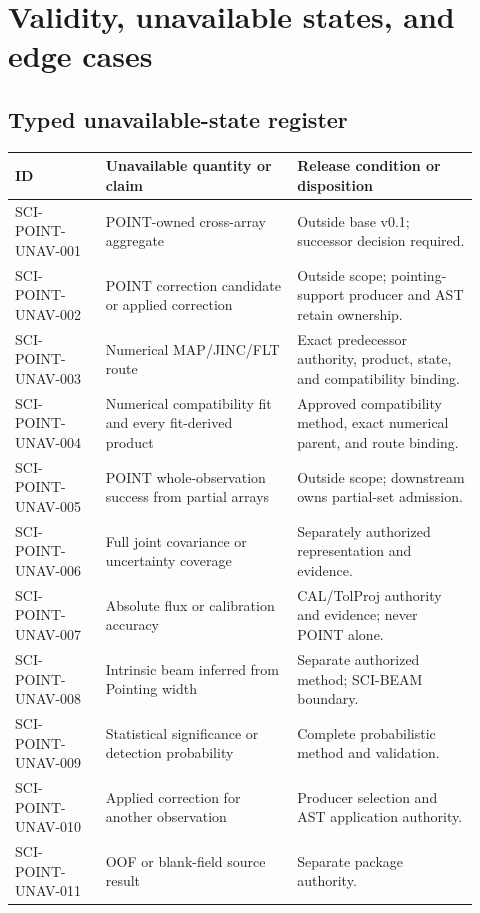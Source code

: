 \section{Validity, unavailable states, and edge cases}\label{sec:validity}

\subsection{Typed unavailable-state register}\label{sec:unavailable-register}

\small
\begin{longtable}{@{}p{0.18\linewidth}p{0.38\linewidth}p{0.36\linewidth}@{}}
\toprule
ID & Unavailable quantity or claim & Release condition or disposition \\
\midrule
\endhead
SCI-POINT-UNAV-001 & POINT-owned cross-array aggregate & Outside base v0.1; successor decision required. \\
SCI-POINT-UNAV-002 & POINT correction candidate or applied correction & Outside scope; pointing-support producer and AST retain ownership. \\
SCI-POINT-UNAV-003 & Numerical MAP/JINC/FLT route & Exact predecessor authority, product, state, and compatibility binding. \\
SCI-POINT-UNAV-004 & Numerical compatibility fit and every fit-derived product & Approved compatibility method, exact numerical parent, and route binding. \\
SCI-POINT-UNAV-005 & POINT whole-observation success from partial arrays & Outside scope; downstream owns partial-set admission. \\
SCI-POINT-UNAV-006 & Full joint covariance or uncertainty coverage & Separately authorized representation and evidence. \\
SCI-POINT-UNAV-007 & Absolute flux or calibration accuracy & CAL/TolProj authority and evidence; never POINT alone. \\
SCI-POINT-UNAV-008 & Intrinsic beam inferred from Pointing width & Separate authorized method; SCI-BEAM boundary. \\
SCI-POINT-UNAV-009 & Statistical significance or detection probability & Complete probabilistic method and validation. \\
SCI-POINT-UNAV-010 & Applied correction for another observation & Producer selection and AST application authority. \\
SCI-POINT-UNAV-011 & OOF or blank-field source result & Separate package authority. \\

\end{longtable}
